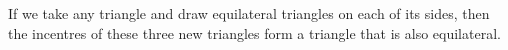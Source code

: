 If we take any triangle and draw equilateral triangles on each 
of its sides, then the incentres of these three new triangles
form a triangle that is also equilateral.
